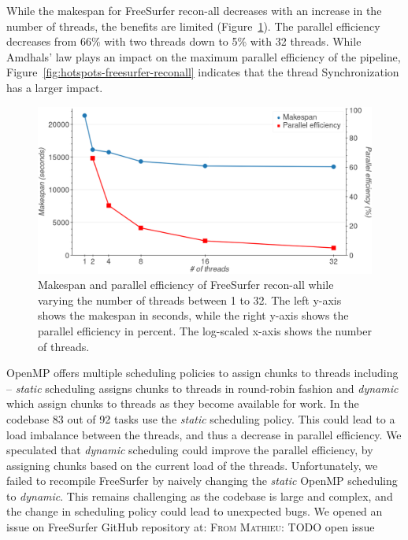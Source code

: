 \documentclass[conference]{IEEEtran}
\newcommand{\MD}[1]{\color{magenta}\textsc{From Mathieu: }#1\color{black}}
\begin{document}
While the makespan for FreeSurfer recon-all decreases with an increase in the number of threads, the benefits are limited (Figure~\ref{fig:freesurfer-threading}). The parallel efficiency decreases from 66\% with two threads down to 5\% with 32 threads. While Amdhals' law plays an impact on the maximum parallel efficiency of the pipeline, Figure~\ref{fig:hotspots-freesurfer-reconall} indicates that the thread Synchronization has a larger impact.
					
\begin{figure}
	\includegraphics[width=\linewidth]{figures/makespan-freesurfer.png}
	\caption{Makespan and parallel efficiency of FreeSurfer recon-all while varying the number of threads between 1 to 32. The left y-axis shows the makespan in seconds, while the right y-axis shows the parallel efficiency in percent. The log-scaled x-axis shows the number of threads.}
	\label{fig:freesurfer-threading}
\end{figure}

OpenMP offers multiple scheduling policies to assign chunks to threads including -- \textit{static} scheduling assigns chunks to threads in round-robin fashion and \textit{dynamic} which assign chunks to threads as they become available for work. In the codebase 83 out of 92 tasks use the \textit{static} scheduling policy. This could lead to a load imbalance between the threads, and thus a decrease in parallel efficiency. We speculated that \textit{dynamic} scheduling could improve the parallel efficiency, by assigning chunks based on the current load of the threads. Unfortunately, we failed to recompile FreeSurfer by naively changing the \textit{static} OpenMP scheduling to \textit{dynamic}. This remains challenging as the codebase is large and complex, and the change in scheduling policy could lead to unexpected bugs.
We opened an issue on FreeSurfer GitHub repository at: \href{}{} \MD{TODO open issue}
			
\end{document}
